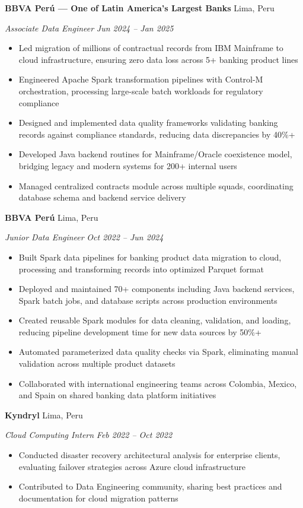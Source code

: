 \documentclass[11pt,letterpaper]{article}
\newcommand{\entry}[4]{%
  \noindent\textbf{#1} \hfill #2 \par\nopagebreak
  \textit{#3} \hfill \textit{#4} \par\nopagebreak
}
\begin{document}
\entry{BBVA Per\'{u} — One of Latin America's Largest Banks}{Lima, Peru}{Associate Data Engineer}{Jun 2024 -- Jan 2025}
\begin{itemize}
  \item Led migration of millions of contractual records from IBM Mainframe to cloud infrastructure, ensuring zero data loss across 5+ banking product lines
  \item Engineered Apache Spark transformation pipelines with Control-M orchestration, processing large-scale batch workloads for regulatory compliance
  \item Designed and implemented data quality frameworks validating banking records against compliance standards, reducing data discrepancies by 40\%+
  \item Developed Java backend routines for Mainframe/Oracle coexistence model, bridging legacy and modern systems for 200+ internal users
  \item Managed centralized contracts module across multiple squads, coordinating database schema and backend service delivery
\end{itemize}
\vspace{0.3em}

\entry{BBVA Per\'{u}}{Lima, Peru}{Junior Data Engineer}{Oct 2022 -- Jun 2024}
\begin{itemize}
  \item Built Spark data pipelines for banking product data migration to cloud, processing and transforming records into optimized Parquet format
  \item Deployed and maintained 70+ components including Java backend services, Spark batch jobs, and database scripts across production environments
  \item Created reusable Spark modules for data cleaning, validation, and loading, reducing pipeline development time for new data sources by 50\%+
  \item Automated parameterized data quality checks via Spark, eliminating manual validation across multiple product datasets
  \item Collaborated with international engineering teams across Colombia, Mexico, and Spain on shared banking data platform initiatives
\end{itemize}
\vspace{0.3em}

\entry{Kyndryl}{Lima, Peru}{Cloud Computing Intern}{Feb 2022 -- Oct 2022}
\begin{itemize}
  \item Conducted disaster recovery architectural analysis for enterprise clients, evaluating failover strategies across Azure cloud infrastructure
  \item Contributed to Data Engineering community, sharing best practices and documentation for cloud migration patterns
\end{itemize}
\vspace{0.3em}
\end{document}
